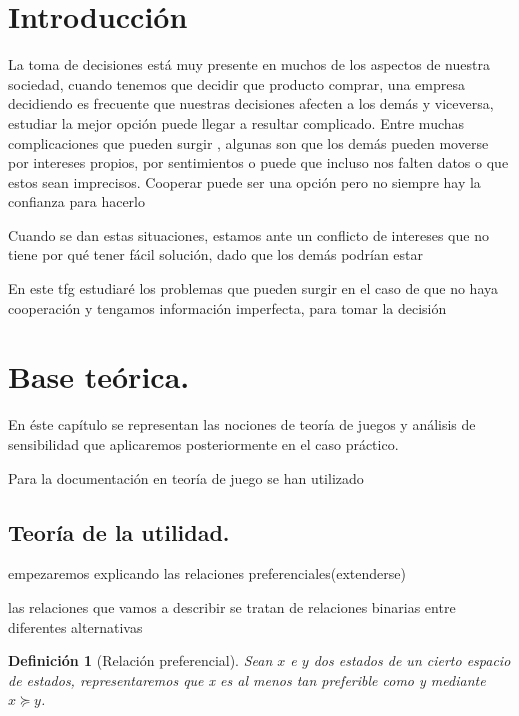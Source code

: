 \documentclass[16pt, a4paper]{article} %
\newtheorem{definicion}{Definición}[section]
\begin{document}
\tableofcontents

\newpage

\section{Introducción}

La toma de decisiones está muy presente en muchos de los aspectos de nuestra sociedad, cuando tenemos que decidir que producto comprar, una empresa decidiendo 
es frecuente que  nuestras decisiones afecten a los demás y viceversa, estudiar la mejor opción puede llegar a resultar complicado. Entre muchas complicaciones que pueden surgir , algunas son que los demás pueden moverse por intereses propios, por sentimientos o puede que incluso nos falten datos o que estos sean imprecisos. Cooperar puede ser una opción pero no siempre hay la confianza para hacerlo





Cuando se dan estas situaciones, estamos ante un conflicto de intereses que no tiene por qué tener fácil solución, dado que los demás podrían estar 








En este tfg estudiaré los problemas que pueden surgir en el caso de que no haya cooperación y tengamos información imperfecta, para tomar la decisión 

\section{Base teórica.}


En éste capítulo se representan las nociones de teoría de juegos y análisis de sensibilidad que aplicaremos posteriormente en el caso práctico.

Para la documentación en teoría de juego se han utilizado




\subsection{Teoría de la utilidad.}

empezaremos explicando las relaciones preferenciales(extenderse)


las relaciones que vamos a describir se tratan de relaciones binarias entre diferentes alternativas

\begin{definicion}[Relación preferencial]
 Sean $x$ e $y$ dos estados de un cierto espacio de estados, representaremos que x es al menos tan preferible como y mediante $x \succeq y$. 
\end{definicion}
\end{document}
